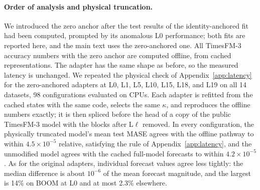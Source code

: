 \paragraph{Order of analysis and physical truncation.} We introduced the zero anchor after the test results of the identity-anchored fit had been computed, prompted by its anomalous L0 performance; both fits are reported here, and the main text uses the zero-anchored one. All TimesFM-3 accuracy numbers with the zero anchor are computed offline, from cached representations. The adapter has the same shape as before, so the measured latency is unchanged. We repeated the physical check of Appendix~\ref{app:latency} for the zero-anchored adapters at L0, L1, L5, L10, L15, L18, and L19 on all 14 datasets, 98 configurations evaluated on CPUs. Each adapter is refitted from the cached states with the same code, selects the same $\kappa$, and reproduces the offline numbers exactly; it is then spliced before the head of a copy of the public TimesFM-3 model with the blocks after L$\ell$ removed. In every configuration, the physically truncated model's mean test MASE agrees with the offline pathway to within $4.5\times10^{-5}$ relative, satisfying the rule of Appendix~\ref{app:latency}, and the unmodified model agrees with the cached full-model forecasts to within $4.2\times10^{-5}$. As for the original adapters, individual forecast values agree less tightly: the median difference is about $10^{-6}$ of the mean forecast magnitude, and the largest is 14\% on BOOM at L0 and at most 2.3\% elsewhere.

